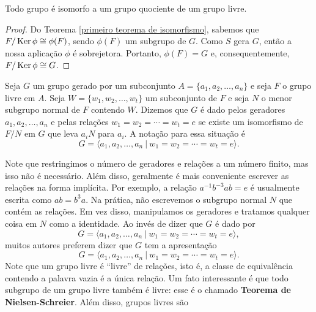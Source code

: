 	\begin{corollary}
	\label{iso grupo quociente}
		Todo grupo é isomorfo a um grupo quociente de um grupo livre.
	\end{corollary}
	\begin{proof}
		Do Teorema \ref{primeiro teorema de isomorfismo}, sabemos que $F/\operatorname{Ker}\phi\cong \phi(F)$, 
		sendo $\phi(F)$ um subgrupo de $G$. Como $S$ gera $G$, então a nossa aplicação $\phi$ é sobrejetora.
		Portanto, $\phi(F) = G$ e, consequentemente, $F/\operatorname{Ker}\phi\cong G$.
	\end{proof}
	\begin{definition}
		Seja $G$ um grupo gerado por um subconjunto $A = \{ a_1, a_2, \dots, a_n \}$ e seja 
		$F$ o grupo livre em $A$. Seja $W = \{ w_1, w_2, \dots, w_t \}$ um subconjunto de $F$ e seja 
		$N$ o menor subgrupo normal de $F$ contendo $W$. Dizemos que $G$ é dado pelos geradores 
		$a_1, a_2, \dots, a_n$ e pelas relações $w_1 = w_2 = \cdots = w_t = e$ se existe um isomorfismo 
		de $F/N$ em $G$ que leva $a_iN$ para $a_i$. A notação para essa situação é
    	\begin{equation*}
    	    G = \langle a_1, a_2, \dots, a_n \ | \ w_1 = w_2 = \cdots = w_t = e \rangle.
    	\end{equation*}
	\end{definition}
	Note que restringimos o número de geradores e relações a um número finito, 
	mas isso não é necessário. Além disso, geralmente é mais conveniente escrever as relações na 
	forma implícita. Por exemplo, a relação $a^{-1}b^{-3}ab = e$ é usualmente escrita como $ab = b^3a$.
	Na prática, não escrevemos o subgrupo normal $N$ que contém as relações. Em vez disso, manipulamos os
	geradores e tratamos qualquer coisa em $N$ como a identidade. Ao invés de dizer que $G$ é dado por  
	\begin{equation*}
	    G = \langle a_1, a_2, \dots, a_n \ | \ w_1 = w_2 = \cdots = w_t = e \rangle,
	\end{equation*}
	muitos autores preferem dizer que $G$ tem a apresentação 
	\begin{equation*}
	    G = \langle a_1, a_2, \dots, a_n \ | \ w_1 = w_2 = \cdots = w_t = e \rangle.
	\end{equation*}
	Note que um grupo livre é ``livre'' de relações, isto é, a classe de equivalência 
	contendo a palavra vazia é a única relação. Um fato interessante é que todo subgrupo de um grupo livre 
	também é livre: esse é o chamado \textbf{Teorema de Nielsen-Schreier}. Além disso, grupos livres são
